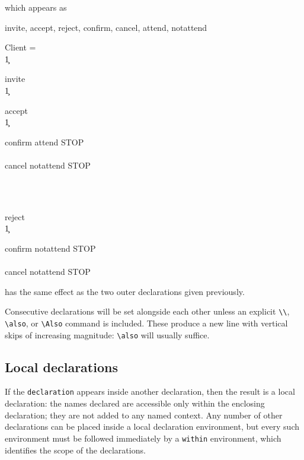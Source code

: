 \documentclass[fleqn,a4paper]{article}
\begin{document}
which appears as
\begin{declaration}[DiaryOne]
  \begin{channel}
    invite, accept, reject, confirm, cancel, 
    attend, notattend
  \end{channel} \also 
  \begin{process}
    Client = {} \\
    \c1 
    \begin{block}
      invite \then {} \\
      \c1 
      \begin{block}
        accept \then {} \\
        \c1
        \begin{block}
          confirm \then attend \then STOP \\
          \extchoice \\
          cancel \then notattend \then STOP 
        \end{block} \\
        \intchoice \\
        \begin{block}
          reject \then {} \\
          \c1
          \begin{block}
            confirm \then notattend \then STOP \\
            \extchoice \\
            cancel \then notattend \then STOP 
          \end{block}
        \end{block}
      \end{block}
    \end{block}
  \end{process}
\end{declaration}
has the same effect as the two outer declarations given previously. 

Consecutive declarations will be set alongside each other unless an
explicit \verb=\\=, \verb=\also=, or \verb=\Also= command is included.
These produce a new line with vertical skips of increasing magnitude:
\verb=\also= will usually suffice.

\subsection{Local declarations}

If the \verb=declaration= appears inside another declaration, then the
result is a local declaration: the names declared are accessible only
within the enclosing declaration; they are not added to any named
context.  Any number of other declarations can be placed inside a
local declaration environment, but every such environment must be
followed immediately by a \verb=within= environment, which identifies
the scope of the declarations.
\end{document}
